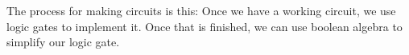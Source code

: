 
The process for making circuits is this: Once we have a working circuit, we use logic gates to implement it. Once that is finished, we can use boolean algebra to simplify our logic gate.
